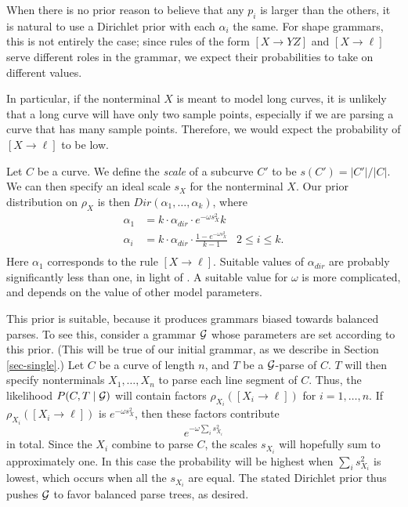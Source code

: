 \documentclass{article}
\begin{document}
When there is no prior reason to believe that any $p_i$ is larger than
the others, it is natural to use a Dirichlet prior with each
$\alpha_i$ the same. For shape grammars, this is not entirely the
case; since rules of the form $[X\to YZ]$ and $[X\to \ell]$ serve
different roles in the grammar, we expect their probabilities to take
on different values. 

In particular, if the nonterminal $X$ is meant to model long curves,
it is unlikely that a long curve will have only two sample points,
especially if we are parsing a curve that has many sample
points. Therefore, we would expect the probability of $[X\to \ell]$ to
be low.

Let $C$ be a curve. We define the \emph{scale} of a subcurve $C'$ to
be $s(C') = |C'| / |C|$. We can then specify an ideal scale $s_X$ for
the nonterminal $X$. Our prior distribution on $\rho_X$ is then
$Dir(\alpha_1,\dots,\alpha_k)$, where
\begin{align*}
\alpha_1 &= k \cdot \alpha_{dir} \cdot e^{-\omega s_X^2}k &\\
\alpha_i &= k \cdot \alpha_{dir} \cdot \frac{1 - e^{-\omega s_X^2}}{k-1} & 2 \le i \le k.\\
\end{align*}
Here $\alpha_1$ corresponds to the rule $[X\to \ell]$. Suitable values
of $\alpha_{dir}$ are probably significantly less than one, in light
of \cite{johnson-naacl}. A suitable value for $\omega$ is more
complicated, and depends on the value of other model parameters.

This prior is suitable, because it produces grammars biased towards
balanced parses. To see this, consider a grammar ${\mathcal G}$ whose
parameters are set according to this prior. (This will be true of our
initial grammar, as we describe in Section \ref{sec-single}.)  Let $C$ be a
curve of length $n$, and $T$ be a ${\mathcal G}$-parse of $C$. $T$ will then
specify nonterminals $X_1,\dots,X_n$ to parse each line segment of
$C$. Thus, the likelihood $P(C,T\mid {\mathcal G})$ will contain factors
$\rho_{X_i}([X_i\to \ell])$ for $i=1,\dots,n$. If $\rho_{X_i}([X_i\to
\ell])$ is $e^{-\omega s_X^2}$, then these factors contribute
$$e^{-\omega \sum_i s_{X_i}^2}$$
in total. Since the $X_i$ combine to parse $C$, the scales $s_{X_i}$
will hopefully sum to approximately one. In this case the probability
will be highest when $\sum_i s_{X_i}^2$ is lowest, which occurs when
all the $s_{X_i}$ are equal. The stated Dirichlet prior thus pushes
${\mathcal G}$ to favor balanced parse trees, as desired.
\end{document}
